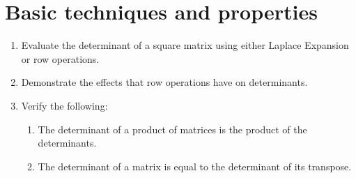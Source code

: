 \section{Basic techniques and properties}

\begin{outcome}
  \begin{enumerate}
  \item Evaluate the determinant of a square matrix using either
    Laplace Expansion or row operations.
  \item Demonstrate the effects that row operations have on
    determinants.
  \item Verify the following:
    \begin{enumerate}
    \item The determinant of a product of matrices is the product of the
      determinants.
    \item The determinant of a matrix is equal to the determinant of its
      transpose.
    \end{enumerate}
  \end{enumerate}
\end{outcome}
